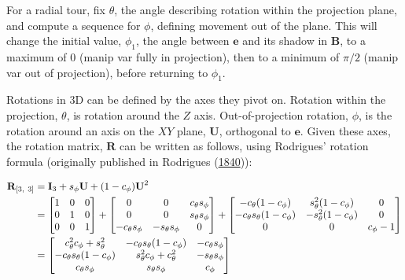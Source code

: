 For a radial tour, fix \(\theta\), the angle describing rotation within
the projection plane, and compute a sequence for \(\phi\), defining
movement out of the plane. This will change the initial value,
\(\phi_1\), the angle between \(\textbf{e}\) and its shadow in
\(\textbf{B}\), to a maximum of \(0\) (manip var fully in projection),
then to a minimum of \(\pi/2\) (manip var out of projection), before
returning to \(\phi_1\).

Rotations in 3D can be defined by the axes they pivot on. Rotation
within the projection, \(\theta\), is rotation around the \(Z\) axis.
Out-of-projection rotation, \(\phi\), is the rotation around an axis on
the \(XY\) plane, \(\textbf{U}\), orthogonal to \(\textbf{e}\). Given
these axes, the rotation matrix, \(\textbf{R}\) can be written as
follows, using Rodrigues' rotation formula (originally published in
Rodrigues (\protect\hyperlink{ref-rodrigues_lois_1840}{1840})):

\begin{align*}
    \textbf{R}_{[3,~3]} 
    &= \textbf{I}_3 + s_\phi\*\textbf{U} + (1-c_\phi)\*\textbf{U}^2 \\
        &=
    \begin{bmatrix}
      1 & 0 & 0 \\ 
      0 & 1 & 0 \\ 
      0 & 0 & 1 \\
    \end{bmatrix} +
    \begin{bmatrix}
      0 & 0 & c_\theta s_\phi \\
      0 & 0 & s_\theta s_\phi \\
      -c_\theta s_\phi & -s_\theta s_\phi & 0 \\
    \end{bmatrix} +
    \begin{bmatrix}
      -c_\theta (1-c_\phi) & s^2_\theta (1-c_\phi) & 0 \\
      -c_\theta s_\theta (1-c_\phi) & -s^2_\theta (1-c_\phi) & 0 \\
      0 & 0 & c_\phi-1 \\
    \end{bmatrix} \\
    &= 
    \begin{bmatrix}
      c_\theta^2 c_\phi + s_\theta^2 &
      -c_\theta s_\theta (1 - c_\phi) &
      -c_\theta s_\phi \\
      -c_\theta s_\theta (1 - c_\phi) &
      s_\theta^2 c_\phi + c_\theta^2 &
      -s_\theta s_\phi \\
      c_\theta s_\phi &
      s_\theta s_\phi &
      c_\phi
    \end{bmatrix} \\
\end{align*}

